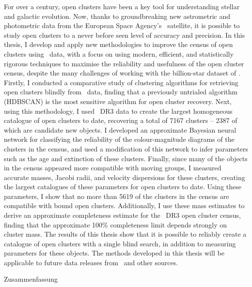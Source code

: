 %

\label{sec:abstract}


For over a century, open clusters have been a key tool for understanding stellar and galactic evolution. Now, thanks to groundbreaking new astrometric and photometric data from the European Space Agency's \gaia\ satellite, it is possible to study open clusters to a never before seen level of accuracy and precision. In this thesis, I develop and apply new methodologies to improve the census of open clusters using \gaia\ data, with a focus on using modern, efficient, and statistically rigorous techniques to maximise the reliability and usefulness of the open cluster census, despite the many challenges of working with the billion-star dataset of \gaia. Firstly, I conducted a comparative study of clustering algorithms for retrieving open clusters blindly from \gaia\ data, finding that a previously untrialed algorithm (HDBSCAN) is the most sensitive algorithm for open cluster recovery. Next, using this methodology, I used \gaia\ DR3 data to create the largest homogeneous catalogue of open clusters to date, recovering a total of 7167 clusters -- 2387 of which are candidate new objects. I developed an approximate Bayesian neural network for classifying the reliability of the colour-magnitude diagrams of the clusters in the census, and used a modification of this network to infer parameters such as the age and extinction of these clusters. Finally, since many of the objects in the census appeared more compatible with moving groups, I measured accurate masses, Jacobi radii, and velocity dispersions for these clusters, creating the largest catalogues of these parameters for open clusters to date. Using these parameters, I show that no more than 5619 of the clusters in the census are compatible with bound open clusters. Additionally, I use these mass estimates to derive an approximate completeness estimate for the \gaia\ DR3 open cluster census, finding that the approximate 100\% completeness limit depends strongly on cluster mass. The results of this thesis show that it is possible to reliably create a catalogue of open clusters with a single blind search, in addition to measuring parameters for these objects. The methods developed in this thesis will be applicable to future data releases from \gaia\ and other sources.




\newpage

{Zusammenfassung}
\label{sec:abstract-diff}

